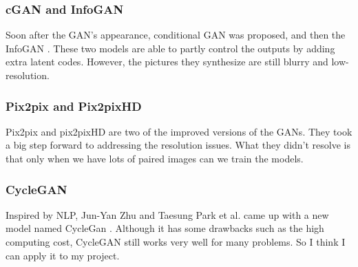 \documentclass{article}
\begin{document}
\subsubsection{cGAN and InfoGAN}
\indent Soon after the GAN's appearance, conditional GAN \cite{Mirza2014Conditional} was proposed, and then the InfoGAN \cite{Chen2016InfoGAN}. These two models are able to partly control the outputs by adding extra latent codes. However, the pictures they synthesize are still blurry and low-resolution.


\subsubsection{Pix2pix and Pix2pixHD}
\indent Pix2pix \cite{Isola2017Image} and pix2pixHD \cite{pix2pixHD} are two of the improved versions of the GANs. They took a big step forward to addressing the resolution issues. What they didn't resolve is that only when we have lots of paired images can we train the models.

\subsubsection{CycleGAN}
\indent Inspired by NLP, Jun-Yan Zhu and Taesung Park et al. came up with a new model named CycleGan \cite{Zhu2017Unpaired}. Although it has some drawbacks such as the high computing cost, CycleGAN still works very well for many problems. So I think I can apply it to my project.
\end{document}
